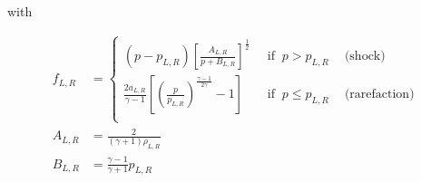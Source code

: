 with 

\begin{align}
	f_{L,R} &= 
		\begin{cases}
			(p - p_{L,R}) \left[ \frac{A_{L,R}}{p + B_{L,R}} \right]^{\frac{1}{2}}
				& ~\text{ if } ~ p > p_{L,R} ~ \quad \text{(shock)} \\
			\frac{2 a_{L,R}}{\gamma - 1} \left[ \left( \frac{p}{p_{L,R}} \right)^ \frac{\gamma -1}{2 \gamma} - 1 \right]
				& ~\text{ if } ~ p \leq p_{L,R} ~ \quad \text{(rarefaction)} \label{eq:riemann-pstar}\\
		\end{cases} \\
	A_{L,R} &= 
		\frac{2}{(\gamma + 1) \rho_{L,R}}\\
	B_{L,R} &= 
		\frac{\gamma - 1}{\gamma + 1} p_{L,R}
\end{align}













